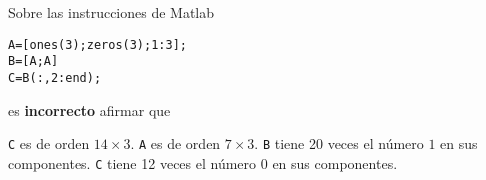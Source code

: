 \begin{pregunta}
\begin{cuerpo}
 
Sobre las instrucciones de Matlab

\begin{lstlisting}
A=[ones(3);zeros(3);1:3];
B=[A;A]
C=B(:,2:end);
\end{lstlisting}
es {\bf incorrecto} afirmar que
\end{cuerpo}
\begin{alternativas}
 {\texttt{C} es de orden $14\times 3$.}
{\texttt{A} es de orden $7\times 3$.}
{\texttt{B} tiene 20 veces el n\'umero $1$ en sus componentes.}
{\texttt{C} tiene 12 veces el n\'umero $0$ en sus componentes.}
\end{alternativas}
\justificacion{0cm}
\end{pregunta}